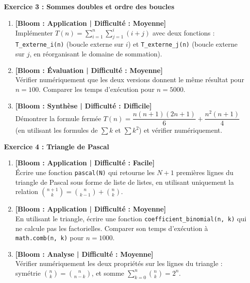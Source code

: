 \documentclass[12pt,a4paper]{report}
\begin{document}
\vspace{0.3cm}

\noindent\textbf{Exercice 3 : Sommes doubles et ordre des boucles}
\begin{enumerate}
    \item \textbf{[Bloom : Application | Difficulté : Moyenne]} \\
    Implémenter $T(n) = \sum_{i=1}^{n} \sum_{j=1}^{i} (i + j)$ avec deux fonctions :
    \texttt{T\_externe\_i(n)} (boucle externe sur $i$) et \texttt{T\_externe\_j(n)} (boucle externe sur $j$, en réorganisant le domaine de sommation).
    \item \textbf{[Bloom : Évaluation | Difficulté : Moyenne]} \\
    Vérifier numériquement que les deux versions donnent le même résultat pour $n = 100$. Comparer les temps d'exécution pour $n = 5000$.
    \item \textbf{[Bloom : Synthèse | Difficulté : Difficile]} \\
    Démontrer la formule fermée $T(n) = \dfrac{n(n+1)(2n+1)}{6} + \dfrac{n^2(n+1)}{4}$ (en utilisant les formules de $\sum k$ et $\sum k^2$) et vérifier numériquement.
\end{enumerate}

\vspace{0.3cm}

\noindent\textbf{Exercice 4 : Triangle de Pascal}
\begin{enumerate}
    \item \textbf{[Bloom : Application | Difficulté : Facile]} \\
    Écrire une fonction \texttt{pascal(N)} qui retourne les $N+1$ premières lignes du triangle de Pascal sous forme de liste de listes, en utilisant uniquement la relation $\binom{n+1}{k} = \binom{n}{k-1} + \binom{n}{k}$.
    \item \textbf{[Bloom : Application | Difficulté : Moyenne]} \\
    En utilisant le triangle, écrire une fonction \texttt{coefficient\_binomial(n, k)} qui ne calcule pas les factorielles. Comparer son temps d'exécution à \texttt{math.comb(n, k)} pour $n = 1000$.
    \item \textbf{[Bloom : Analyse | Difficulté : Moyenne]} \\
    Vérifier numériquement les deux propriétés sur les lignes du triangle :
    symétrie $\binom{n}{k} = \binom{n}{n-k}$, et somme $\sum_{k=0}^{n} \binom{n}{k} = 2^n$.
\end{enumerate}
\end{document}
